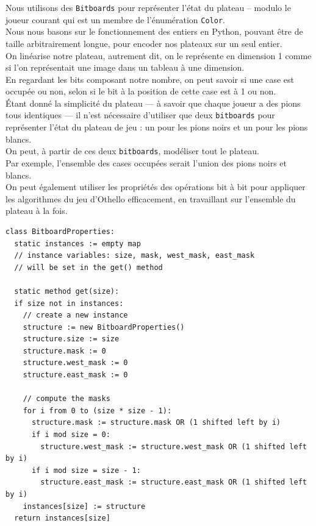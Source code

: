 \documentclass[a4paper,12pt]{article}
\begin{document}
Nous utilisons des \texttt{Bitboards} pour représenter l’état du plateau –
modulo le joueur courant qui est un membre de l’énumération \texttt{Color}.\\
Nous nous basons sur le fonctionnement des entiers en Python, pouvant être de
taille arbitrairement longue, pour encoder nos plateaux sur un seul entier.\\
On linéarise notre plateau, autrement dit, on le représente en dimension 1
comme si l’on représentait une image dans un tableau à une dimension.\\ En
regardant les bits composant notre nombre, on peut savoir si une case est
occupée ou non, selon si le bit à la position de cette case est à 1 ou non.\\

Étant donné la simplicité du plateau — à savoir que chaque joueur a des pions
tous identiques — il n’est nécessaire d’utiliser que deux \texttt{bitboards}
pour représenter l’état du plateau de jeu : un pour les pions noirs et un pour
les pions blancs.\\ On peut, à partir de ces deux \texttt{bitboards}, modéliser
tout le plateau.\\

Par exemple, l’ensemble des cases occupées serait l’union des pions noirs et
blancs.\\ On peut également utiliser les propriétés des opérations bit à bit
pour appliquer les algorithmes du jeu d’Othello efficacement, en travaillant
sur l’ensemble du plateau à la fois.\\

\begin{lstlisting}[caption={Pseudocode pour l'initialisation des bitboards : classe BitboardProperties}, label={lst:bitboard_properties}]
class BitboardProperties:
  static instances := empty map
  // instance variables: size, mask, west_mask, east_mask
  // will be set in the get() method

  static method get(size):
  if size not in instances:
    // create a new instance
    structure := new BitboardProperties()
    structure.size := size
    structure.mask := 0
    structure.west_mask := 0
    structure.east_mask := 0

    // compute the masks
    for i from 0 to (size * size - 1):
      structure.mask := structure.mask OR (1 shifted left by i)
      if i mod size = 0:
        structure.west_mask := structure.west_mask OR (1 shifted left by i)
      if i mod size = size - 1:
        structure.east_mask := structure.east_mask OR (1 shifted left by i)
    instances[size] := structure
  return instances[size]
\end{lstlisting}
\end{document}

